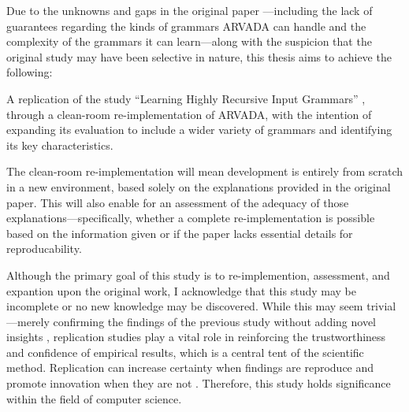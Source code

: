 Due to the unknowns and gaps in the original paper \cite{kulkarniLearningHighlyRecursive2021}—including the lack of guarantees regarding the kinds of grammars ARVADA can handle and the complexity of the grammars it can learn—along with the suspicion that the original study may have been selective in nature, this thesis aims to achieve the following:

\vspace{\baselineskip}
A replication of the study “Learning Highly Recursive Input Grammars” \cite{kulkarniLearningHighlyRecursive2021}, through a clean-room re-implementation of ARVADA, with the intention of expanding its evaluation to include a wider variety of grammars and identifying its key characteristics.

\vspace{\baselineskip}
The clean-room re-implementation will mean development is entirely from scratch in a new environment, based solely on the explanations provided in the original paper. This will also enable for an assessment of the adequacy of those explanations—specifically, whether a complete re-implementation is possible based on the information given or if the paper lacks essential details for reproducability.

\vspace{\baselineskip}
Although the primary goal of this study is to re-implemention, assessment, and expantion upon the original work, I acknowledge that this study may be incomplete or no new knowledge may be discovered. While this may seem trivial—merely confirming the findings of the previous study without adding novel insights \cite{hendriksConsiderItParsed}, replication studies play a vital role in reinforcing the trustworthiness and confidence of empirical results, which is a central tent of the scientific method. Replication can increase certainty when findings are reproduce and promote innovation when they are not \cite{shepperdReplicationStudiesConsidered2018}. Therefore, this study holds significance within the field of computer science.



